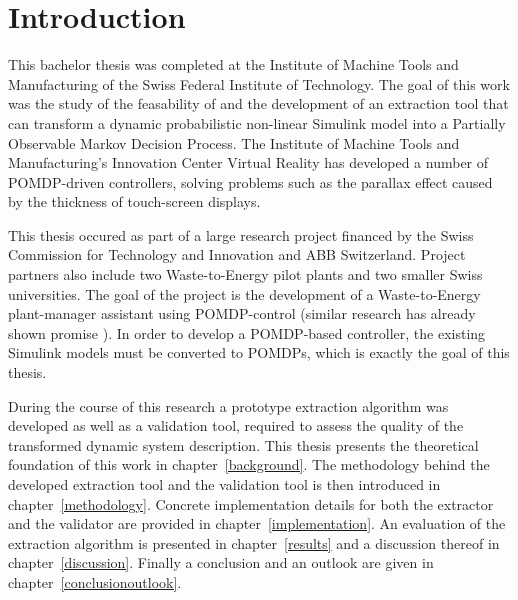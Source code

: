 \setcounter{chapter}{0}

\chapter{Introduction}

This bachelor thesis was completed at the Institute of Machine Tools and Manufacturing of the Swiss Federal Institute of Technology. The goal of this work was the study of the feasability of and the development of an extraction tool that can transform a dynamic probabilistic non-linear Simulink model into a Partially Observable Markov Decision Process. The Institute of Machine Tools and Manufacturing's Innovation Center Virtual Reality has developed a number of POMDP-driven controllers, solving problems such as the parallax effect caused by the thickness of touch-screen displays.

This thesis occured as part of a large research project financed by the Swiss Commission for Technology and Innovation and ABB Switzerland. Project partners also include two Waste-to-Energy pilot plants and two smaller Swiss universities. The goal of the project is the development of a Waste-to-Energy plant-manager assistant using POMDP-control (similar research has already shown promise \cite{ballesterostowards}). In order to develop a POMDP-based controller, the existing Simulink models must be converted to POMDPs, which is exactly the goal of this thesis.

During the course of this research a prototype extraction algorithm was developed as well as a validation tool, required to assess the quality of the transformed dynamic system description. This thesis presents the theoretical foundation of this work in chapter~\ref{background}. The methodology behind the developed extraction tool and the validation tool is then introduced in chapter~\ref{methodology}. Concrete implementation details for both the extractor and the validator are provided in chapter~\ref{implementation}. An evaluation of the extraction algorithm is presented in chapter~\ref{results} and a discussion thereof in chapter~\ref{discussion}. Finally a conclusion and an outlook are given in chapter~\ref{conclusionoutlook}.
